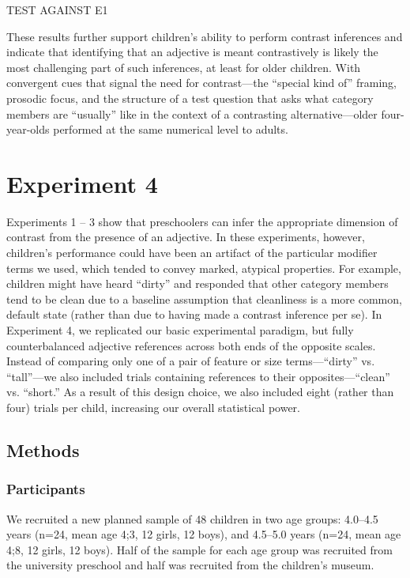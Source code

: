 \documentclass[man]{apa2}
\begin{document}
TEST AGAINST E1

These results further support children's ability to perform contrast inferences and indicate that identifying that an adjective is meant contrastively is likely the most challenging part of such inferences, at least for older children. With convergent cues that signal the need for contrast---the ``special kind of'' framing, prosodic focus, and the structure of a test question that asks what category members are ``usually'' like in the context of a contrasting alternative---older four-year-olds performed at the same numerical level to adults.

\section{Experiment 4} 

Experiments 1 -- 3 show that preschoolers can infer the appropriate dimension of contrast from the presence of an adjective. In these experiments, however, children's performance could have been an artifact of the particular modifier terms we used, which tended to convey marked, atypical properties. For example, children might have heard ``dirty'' and responded that other category members tend to be clean due to a baseline assumption that cleanliness is a more common, default state (rather than due to having made a contrast inference per se). In Experiment 4, we replicated our basic experimental paradigm, but fully counterbalanced adjective references across both ends of the opposite scales. Instead of comparing only one of a pair of feature or size terms---``dirty'' vs. ``tall''---we also included trials containing references to their opposites---``clean'' vs. ``short.''  As a result of this design choice, we also included eight (rather than four) trials per child, increasing our overall statistical power.

\subsection{Methods}

\subsubsection{Participants}

We recruited a new planned sample of 48 children in two age groups: 4.0--4.5 years (n=24, mean age 4;3, 12 girls, 12 boys), and 4.5--5.0 years (n=24, mean age 4;8, 12 girls, 12 boys).  Half of the sample for each age group was recruited from the university preschool and half was recruited from the children's museum.
\end{document}
